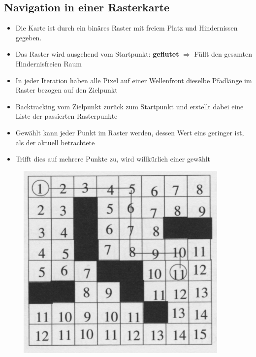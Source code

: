 \subsection{Navigation in einer Rasterkarte}
\begin{itemize}
	\item Die Karte ist durch ein binäres Raster mit freiem Platz und Hindernissen gegeben.
	\item Das Raster wird ausgehend vom Startpunkt: \textbf{geflutet} $\Rightarrow$ Füllt den gesamten Hindernisfreien Raum
	\item In jeder Iteration haben alle Pixel auf einer Wellenfront dieselbe Pfadlänge im Raster bezogen auf den Zielpunkt
	\item Backtracking vom Zielpunkt zurück zum Startpunkt und erstellt dabei eine Liste der passierten Rasterpunkte
	\item Gewählt kann jeder Punkt im Raster werden, dessen Wert eins geringer ist, als der aktuell betrachtete
	\item Trifft dies auf mehrere Punkte zu, wird willkürlich einer gewählt
\end{itemize}
\begin{figure}[H]
	\begin{center}
		\includegraphics[scale=0.6]{Resources/PNG/RasterKarte.PNG}
		\caption{}
		\label{fig:PNG/RasterKarte.PNG}
	\end{center}
\end{figure}
